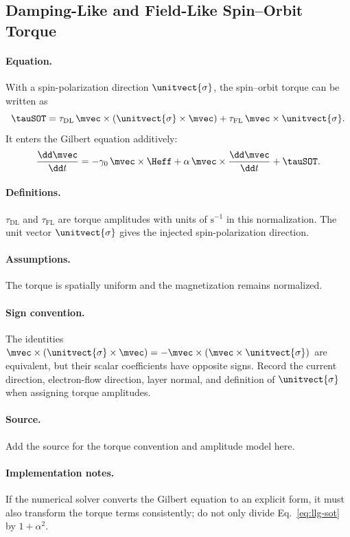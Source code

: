 \subsection{Damping-Like and Field-Like Spin--Orbit Torque}

\paragraph{Equation.}
With a spin-polarization direction $\unitvect{\sigma}$, the spin--orbit torque can be
written as
\begin{equation}
    \tauSOT
    = \tau_{\mathrm{DL}}\,
      \mvec\times(\unitvect{\sigma}\times\mvec)
      + \tau_{\mathrm{FL}}\,
      \mvec\times\unitvect{\sigma}.
    \label{eq:sot-dl-fl}
\end{equation}
It enters the Gilbert equation additively:
\begin{equation}
    \frac{\dd\mvec}{\dd t}
    = -\gamma_0\,\mvec\times\Heff
      + \alpha\,\mvec\times\frac{\dd\mvec}{\dd t}
      + \tauSOT.
    \label{eq:llg-sot}
\end{equation}

\paragraph{Definitions.}
$\tau_{\mathrm{DL}}$ and $\tau_{\mathrm{FL}}$ are torque amplitudes with units of
$\mathrm{s^{-1}}$ in this normalization.  The unit vector $\unitvect{\sigma}$ gives
the injected spin-polarization direction.

\paragraph{Assumptions.}
The torque is spatially uniform and the magnetization remains normalized.

\paragraph{Sign convention.}
The identities
$\mvec\times(\unitvect{\sigma}\times\mvec)
=-\mvec\times(\mvec\times\unitvect{\sigma})$ are equivalent, but their scalar
coefficients have opposite signs.  Record the current direction, electron-flow
direction, layer normal, and definition of $\unitvect{\sigma}$ when assigning torque
amplitudes.

\paragraph{Source.}
Add the source for the torque convention and amplitude model here.

\paragraph{Implementation notes.}
If the numerical solver converts the Gilbert equation to an explicit form, it must
also transform the torque terms consistently; do not only divide Eq.~\eqref{eq:llg-sot}
by $1+\alpha^2$.
